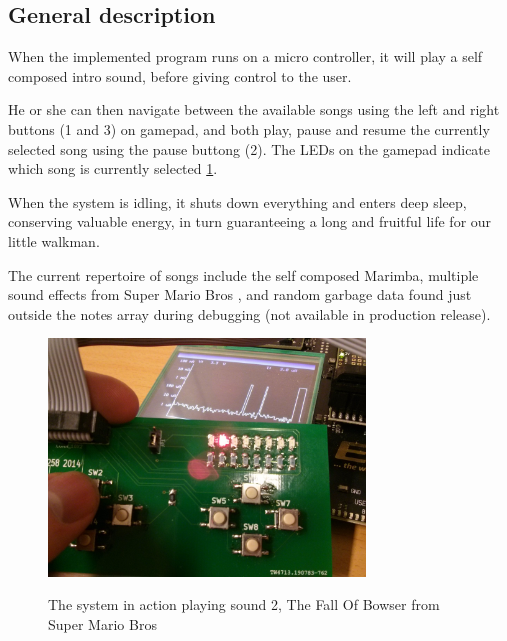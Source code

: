 \subsection{General description}

When the implemented program runs on a micro controller, it will play a self composed intro sound, before giving control to the user.

He or she can then navigate between the available songs using the left and right buttons (1 and 3) on gamepad, and both play, pause and resume the currently selected song using the pause buttong (2).
The LEDs on the gamepad indicate which song is currently selected \ref{fig:systemaction}.

When the system is idling, it shuts down everything and enters deep sleep, conserving valuable energy, in turn guaranteeing a long and fruitful life for our little walkman.

The current repertoire of songs include the self composed Marimba, multiple sound effects from Super Mario Bros \cite{mariobros}, and random garbage data found just outside the notes array during debugging (not available in production release).

\begin{figure}[H]
    \centering
    \includegraphics[width=0.75\textwidth]{figures/system-in-action.jpg}
    \label{fig:systemaction}
    \caption{The system in action playing sound 2, The Fall Of Bowser from Super Mario Bros}
\end{figure}
